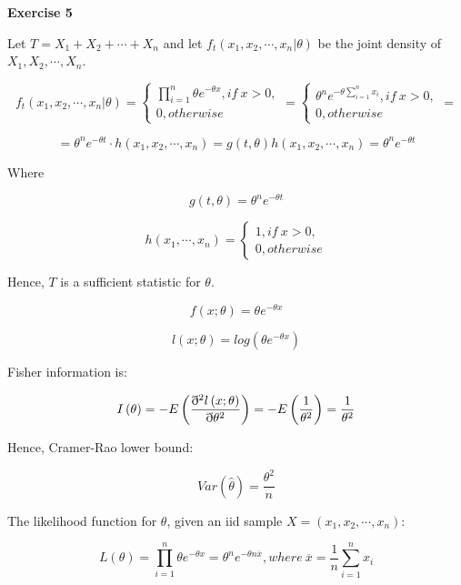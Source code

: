 \documentclass[12pt]{article}
\begin{document}
\textbf{Exercise 5}

\begin{list}{()~}{}
\item Let $T = X_1 + X_2 + \cdots + X_n$ and let $f_t\left(x_1, x_2, \cdots, x_n | \theta\right)$ be the joint density of $X_1, X_2, \cdots, X_n$.


\[f_t\left(x_1, x_2, \cdots, x_n | \theta\right) =\left\{
\begin{array}{l}
{\displaystyle \prod_{i=1}^{n}} \theta e^{-\theta x}, if\ x > 0,\\
0, otherwise
\end{array} \right. = \left\{
\begin{array}{l}
\theta^n e^{-\theta \sum_{i=1}^n x_i}, if\ x > 0,\\
0, otherwise
\end{array} \right. = \] 

\[= \theta^n e^{-\theta t}\cdot h\left(x_1, x_2, \cdots, x_n\right)=g\left(t, \theta\right)h\left(x_1, x_2, \cdots, x_n\right) = \theta^n e^{-\theta t}\]

Where 

\[g\left(t, \theta\right) = \theta^{n}e^{-\theta t}\]

\[h\left(x_1, \cdots, x_n\right) = \left\{
\begin{array}{l}
1, if\ x > 0,\\
0, otherwise
\end{array} \right.\]

Hence, $T$ is a sufficient statistic for $\theta$.
\item
\[f\left(x; \theta\right)=\theta e^{-\theta x}\]

\[l\left(x; \theta\right)=log\left(\theta e^{-\theta x}\right)\]

Fisher information is:

\[I\left(\theta\right)=-E\left(\dfrac{\eth^2 l\left(x; \theta\right)}{\eth \theta^2}\right) = -E\left(\-\dfrac{1}{\theta^2}\right)=\dfrac{1}{\theta^2}\]

Hence, Cramer-Rao lower bound:

\[Var\left(\hat{\theta}\right)= \dfrac{\theta^2}{n}\]
\item The likelihood function for $\theta$, given an iid sample $X=\left(x_1, x_2, \cdots, x_n\right)$:

\[L\left(\theta\right) = {\displaystyle \prod_{i=1}^{n}} \theta e^{-\theta x} = \theta^n e^{-\theta n \overline{x}}, where\ \overline{x} = \dfrac{1}{n}\sum_{i=1}^n x_i\]


\end{list}
\end{document}
